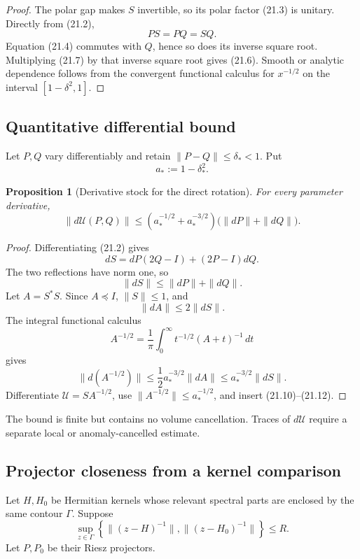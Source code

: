 \documentclass[11pt]{article}
\newtheorem{proposition}[theorem]{Proposition}
\begin{document}
\begin{proof}
The polar gap makes \(S\) invertible, so its polar factor (21.3) is
unitary.  Directly from (21.2),
\[
 PS=PQ=SQ.
 \tag{21.7}
\]
Equation (21.4) commutes with \(Q\), hence so does its inverse square
root.  Multiplying (21.7) by that inverse square root gives (21.6).
Smooth or analytic dependence follows from the convergent functional
calculus for \(x^{-1/2}\) on the interval
\([1-\delta^2,1]\).
\end{proof}

\subsection{Quantitative differential bound}

Let \(P,Q\) vary differentiably and retain
\(\|P-Q\|\leq\delta_*<1\).  Put
\[
 a_*:=1-\delta_*^2.
 \tag{21.8}
\]

\begin{proposition}[Derivative stock for the direct rotation]
\label{prop:v11v21-derivative}
For every parameter derivative,
\[
 \|d\mathcal U(P,Q)\|
 \leq
 \left(a_*^{-1/2}+a_*^{-3/2}\right)
 \bigl(\|dP\|+\|dQ\|\bigr).
 \tag{21.9}
\]
\end{proposition}

\begin{proof}
Differentiating (21.2) gives
\[
 dS=dP(2Q-I)+(2P-I)dQ.
\]
The two reflections have norm one, so
\[
 \|dS\|\leq\|dP\|+\|dQ\|.
 \tag{21.10}
\]
Let \(A=S^*S\).  Since \(A\preceq I\), \(\|S\|\leq1\), and
\[
 \|dA\|\leq2\|dS\|.
 \tag{21.11}
\]
The integral functional calculus
\[
 A^{-1/2}
 =
 \frac1\pi\int_0^\infty t^{-1/2}(A+t)^{-1}\,dt
\]
gives
\[
 \|d(A^{-1/2})\|
 \leq\frac12a_*^{-3/2}\|dA\|
 \leq a_*^{-3/2}\|dS\|.
 \tag{21.12}
\]
Differentiate \(\mathcal U=SA^{-1/2}\), use
\(\|A^{-1/2}\|\leq a_*^{-1/2}\), and insert
(21.10)--(21.12).
\end{proof}

The bound is finite but contains no volume cancellation.  Traces of
\(d\mathcal U\) require a separate local or anomaly-cancelled estimate.

\subsection{Projector closeness from a kernel comparison}

Let \(H,H_0\) be Hermitian kernels whose relevant spectral parts are
enclosed by the same contour \(\Gamma\).  Suppose
\[
 \sup_{z\in\Gamma}
 \left\{
 \|(z-H)^{-1}\|,\|(z-H_0)^{-1}\|
 \right\}\leq R.
 \tag{21.13}
\]
Let \(P,P_0\) be their Riesz projectors.
\end{document}
